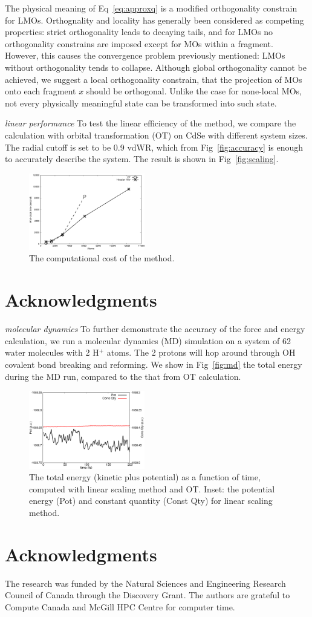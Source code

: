 \documentclass[prl,twocolumn,showpacs]{revtex4}
\begin{document}
The physical meaning of Eq~\ref{eq:approxq} is a modified orthogonality constrain for LMOs. Orthognality and locality has generally been considered as competing properties: strict orthogonality leads to decaying tails, and for LMOs no orthogonality constrains are imposed except for MOs within a fragment. However, this causes the convergence problem previously mentioned: LMOs without orthogonality tends to collapse. Although global orthogonality cannot be achieved, we suggest a local orthogonality constrain, that the projection of MOs onto each fragment $x$ should be orthogonal. Unlike the case for none-local MOs, not every physically meaningful state can be transformed into such state.

\emph{linear performance}
To test the linear efficiency of the method, we compare the calculation with orbital transformation (OT) on CdSe with different system sizes. The radial cutoff is set to be 0.9 vdWR, which from Fig~\ref{fig:accuracy} is enough to accurately describe the system. The result is shown in Fig~\ref{fig:scaling}.

\begin{figure}
\includegraphics[width=0.45\textwidth]{timing}
\caption{The computational cost of the method.}
\end{figure}
\label{fig:scaling}
\section{Acknowledgments} 


\emph{molecular dynamics}
To further demonstrate the accuracy of the force and energy calculation, we run a molecular dynamics (MD) simulation on a system of 62 water molecules with 2 H$^+$ atoms. The 2 protons will hop around through OH covalent bond breaking and reforming. We show in Fig~\ref{fig:md} the total energy during the MD run, compared to the that from OT calculation. 

\begin{figure}
\includegraphics[width=0.45\textwidth]{const}
\caption{The total energy (kinetic plus potential) as a function of time, computed with linear scaling method and OT. Inset: the potential energy (Pot) and constant quantity (Const Qty) for linear scaling method.}
\end{figure}
\section{Acknowledgments} 

The research was funded by the Natural Sciences and Engineering Research Council of Canada through the Discovery Grant. The authors are grateful to Compute Canada and McGill HPC Centre for computer time.


\end{document}
